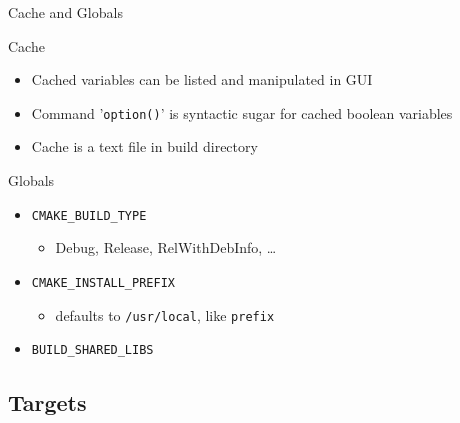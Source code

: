 \documentclass[t]{beamer}
\begin{document}
\begin{frame}{Cache and Globals}
    \begin{block}{Cache}
        \begin{itemize}
            \item Cached variables can be listed and manipulated in GUI
            \item Command '\texttt{option()}' is syntactic sugar for
                cached boolean variables
            \item Cache is a text file in build directory
        \end{itemize}
    \end{block}
    \pause
    \begin{block}{Globals}
        \begin{itemize}
            \item \texttt{CMAKE\_BUILD\_TYPE}
                \begin{itemize}
                    \item Debug, Release, RelWithDebInfo, …
                \end{itemize}
            \item \texttt{CMAKE\_INSTALL\_PREFIX}
                \begin{itemize}
                    \item defaults to \texttt{/usr/local}, like
                        \texttt{\-\-prefix}
                \end{itemize}
            \item \texttt{BUILD\_SHARED\_LIBS}
        \end{itemize}
    \end{block}
\end{frame}

\subsection{Targets}
\end{document}
